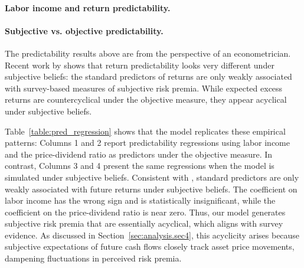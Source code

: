     \paragraph{Labor income and return predictability.} 

    \paragraph{Subjective vs. objective predictability.} 
    The predictability results above are from the perspective of an econometrician. 
    Recent work by \citet{nagel2023dynamics} shows that return predictability looks very different under subjective beliefs: the standard predictors of returns are only weakly associated with survey-based measures of subjective risk premia. 
    While expected excess returns are countercyclical under the objective measure, they appear acyclical under subjective beliefs.
    
    Table~\ref{table:pred_regression} shows that the model replicates these empirical patterns:
    Columns 1 and 2 report predictability regressions using labor income and the price-dividend ratio as predictors under the objective measure. 
    In contrast, Columns 3 and 4 present the same regressions when the model is simulated under subjective beliefs.
    Consistent with \citet{nagel2023dynamics}, standard predictors are only weakly associated with future returns under subjective beliefs. The coefficient on labor income has the wrong sign and is statistically insignificant, while the coefficient on the price-dividend ratio is near zero.
    Thus, our model generates subjective risk premia that are essentially acyclical, which aligns with survey evidence. 
    As discussed in Section~\ref{sec:analysis.sec4}, this acyclicity arises because subjective expectations of future cash flows closely track asset price movements, dampening fluctuations in perceived risk premia.

